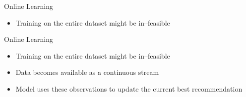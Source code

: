 \begin{frame}{Online Learning}
    \begin{itemize}
        \item Training on the entire dataset might be in--feasible
    \end{itemize}
\end{frame}

\begin{frame}{Online Learning}
    \begin{itemize}
        \item Training on the entire dataset might be in--feasible
        \item Data becomes available as a continuous stream 
        \item Model uses these observations to update the current best recommendation
    \end{itemize}
\end{frame}